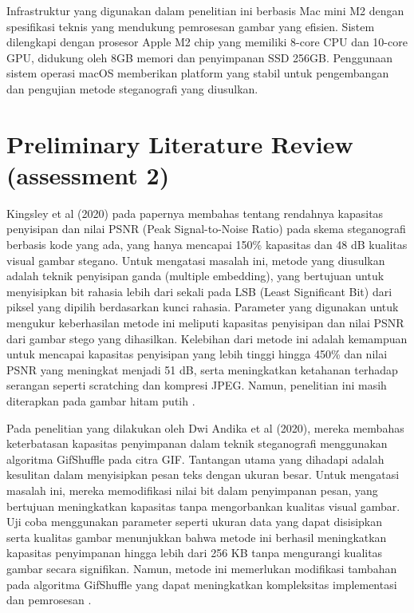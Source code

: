 \documentclass{ittelkom}
\begin{document}
Infrastruktur yang digunakan dalam penelitian ini berbasis Mac mini M2 dengan
spesifikasi teknis yang mendukung pemrosesan gambar yang efisien. Sistem
dilengkapi dengan prosesor Apple M2 chip yang memiliki 8-core CPU dan 10-core
GPU, didukung oleh 8GB memori dan penyimpanan SSD 256GB. Penggunaan sistem
operasi macOS memberikan platform yang stabil untuk pengembangan dan pengujian
metode steganografi yang diusulkan.

\section{Preliminary Literature Review \color{red}(assessment 2)}

Kingsley et al (2020) pada papernya membahas tentang rendahnya kapasitas
penyisipan dan nilai PSNR (Peak Signal-to-Noise Ratio) pada skema steganografi
berbasis kode yang ada, yang hanya mencapai 150\% kapasitas dan 48 dB kualitas
visual gambar stegano. Untuk mengatasi masalah ini, metode yang diusulkan
adalah teknik penyisipan ganda (multiple embedding), yang bertujuan untuk
menyisipkan bit rahasia lebih dari sekali pada LSB (Least Significant Bit) dari
piksel yang dipilih berdasarkan kunci rahasia. Parameter yang digunakan untuk
mengukur keberhasilan metode ini meliputi kapasitas penyisipan dan nilai PSNR
dari gambar stego yang dihasilkan. Kelebihan dari metode ini adalah kemampuan
untuk mencapai kapasitas penyisipan yang lebih tinggi hingga 450\% dan nilai
PSNR yang meningkat menjadi 51 dB, serta meningkatkan ketahanan terhadap
serangan seperti scratching dan kompresi JPEG. Namun, penelitian ini masih
diterapkan pada gambar hitam putih \cite{kingsley2020improving}.

Pada penelitian yang dilakukan oleh Dwi Andika et al (2020), mereka membahas
keterbatasan kapasitas penyimpanan dalam teknik steganografi menggunakan
algoritma GifShuffle pada citra GIF. Tantangan utama yang dihadapi adalah
kesulitan dalam menyisipkan pesan teks dengan ukuran besar. Untuk mengatasi
masalah ini, mereka memodifikasi nilai bit dalam penyimpanan pesan, yang
bertujuan meningkatkan kapasitas tanpa mengorbankan kualitas visual gambar. Uji
coba menggunakan parameter seperti ukuran data yang dapat disisipkan serta
kualitas gambar menunjukkan bahwa metode ini berhasil meningkatkan kapasitas
penyimpanan hingga lebih dari 256 KB tanpa mengurangi kualitas gambar secara
signifikan. Namun, metode ini memerlukan modifikasi tambahan pada algoritma
GifShuffle yang dapat meningkatkan kompleksitas implementasi dan pemrosesan
\cite{andika2020modifikasi}.
\end{document}
